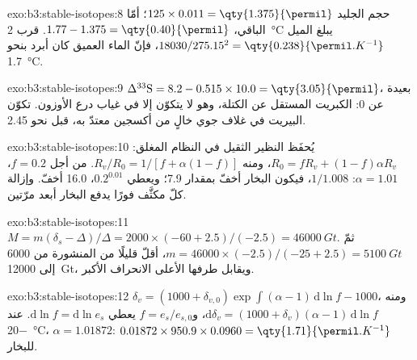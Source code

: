 \begin{solution}{exo:b3:stable-isotopes:8}
حجم الجليد $125\times0.011 = \qty{1.375}{\permil}$؛ أمّا الباقي، $1.77 - 1.375 =
\qty{0.40}{\permil}$. قرب \qty{2}{\celsius} يبلغ الميل $18030/275.15^2 =
\qty{0.238}{\permil.K^{-1}}$، فإنّ الماء العميق كان
أبرد بنحو \qty{1.7}{\celsius}.
\end{solution}

\begin{solution}{exo:b3:stable-isotopes:9}
$\Delta^{33}\mathrm S = 8.2 - 0.515\times10.0 = \qty{3.05}{\permil}$، بعيدة عن 0:
الكبريت المستقل عن الكتلة، وهو لا يتكوّن إلا في غياب درع الأوزون. تكوّن البيريت
في غلاف جوي خالٍ من أكسجين معتدّ به، قبل نحو
\qty{2.45}{\Ga}.
\end{solution}

\begin{solution}{exo:b3:stable-isotopes:10}
يُحفَظ النظير الثقيل في النظام المغلق: $R_0 = fR_v + (1 -
f)\alpha R_v$، ومنه $R_v/R_0 = 1/[f + \alpha(1 - f)]$. من أجل $f = 0.2$، $\alpha =
1.01$: $1/1.008$، فيكون البخار أخفّ بمقدار \qty{7.9}{\permil}؛ ويعطي 
$0.2^{0.01}$، \qty{16.0}{\permil} أخفّ. وإزالة كلّ مكثَّف فورًا
يدفع البخار أبعد مرّتين.
\end{solution}

\begin{solution}{exo:b3:stable-isotopes:11}
$M = m(\delta_s - \Delta)/\Delta = 2000\times(-60 + 2.5)/(-2.5) = \qty{46000}{Gt}$.
ثمّ $m = 46000\times(-2.5)/(-25 + 2.5) = \qty{5100}{Gt}$، أقلّ قليلًا من
المنشورة من 6000 إلى \qty{12000}{Gt}، ويقابل طرفها الأعلى
الانحراف الأكبر.
\end{solution}

\begin{solution}{exo:b3:stable-isotopes:12}
$\delta_v = (1000 + \delta_{v,0})\exp\int(\alpha - 1)\,\mathrm d\ln f - 1000$، ومنه
$\mathrm d\delta_v = (1000 + \delta_v)(\alpha - 1)\,\mathrm d\ln f$، و$f =
e_s/e_{s,0}$ يعطي $\mathrm d\ln f = \mathrm d\ln e_s$. عند \qty{-20}{\celsius}،
$\alpha = 1.01872$: $0.01872\times950.9\times0.0960 =
\qty{1.71}{\permil.K^{-1}}$ للبخار.
\end{solution}

